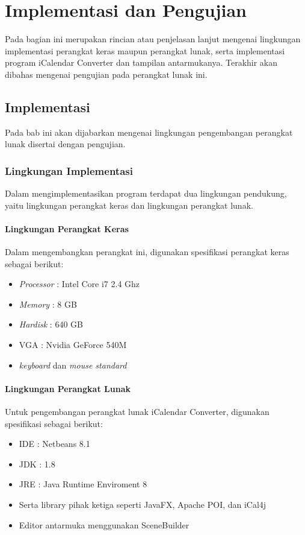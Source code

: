 \chapter{Implementasi dan Pengujian}
\label{chap:implementation}
Pada bagian ini merupakan rincian atau penjelasan lanjut mengenai lingkungan implementasi perangkat keras maupun perangkat lunak,  serta implementasi program iCalendar Converter dan tampilan antarmukanya. Terakhir akan dibahas mengenai pengujian pada perangkat lunak ini.

\section{Implementasi}
Pada bab ini akan dijabarkan mengenai lingkungan pengembangan perangkat lunak disertai dengan pengujian.

\subsection{Lingkungan Implementasi}
Dalam mengimplementasikan program terdapat dua lingkungan pendukung, yaitu lingkungan perangkat keras dan lingkungan perangkat lunak.
\subsubsection{Lingkungan Perangkat Keras}
Dalam mengembangkan perangkat ini, digunakan spesifikasi perangkat keras sebagai berikut:
\begin{itemize}
	\item \textit{Processor} : Intel Core i7 2.4 Ghz
	\item \textit{Memory} : 8 GB
	\item \textit{Hardisk} : 640 GB
	\item VGA : Nvidia GeForce 540M
	\item \textit{keyboard} dan \textit{mouse standard}
\end{itemize}

\subsubsection{Lingkungan Perangkat Lunak}
Untuk pengembangan perangkat lunak iCalendar Converter, digunakan spesifikasi sebagai berikut:
\begin{itemize}
	\item IDE : Netbeans 8.1
	\item JDK : 1.8 \cite{jdk}
	\item JRE : Java Runtime Enviroment 8 \cite{jdk}
	\item Serta library pihak ketiga seperti JavaFX, Apache POI, dan iCal4j
	\item Editor antarmuka menggunakan SceneBuilder
\end{itemize}

